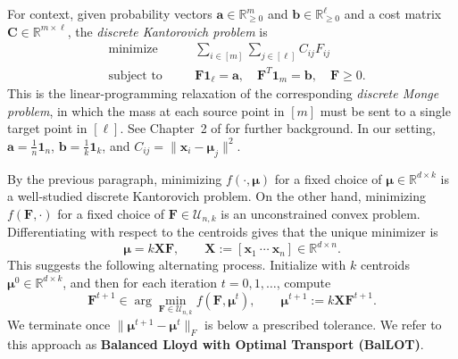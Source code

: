 \documentclass{article}
\theoremstyle{plain}
\theoremstyle{definition}
\newcommand{\1}{\mathbf{1}}
\newcommand{\Rdk}{\mathbb{R}^{d\times k}}
\newcommand{\bUnk}{\mathcal{U}_{n,k}}
\newcommand{\bmF}{\bm{F}}
\newcommand{\bmu}{\bm{\mu}}
\begin{document}
For context, given probability vectors $\bm{a}\in\mathbb{R}^m_{\geq0}$ and $\bm{b}\in\mathbb{R}^{\ell}_{\geq0}$ and a cost matrix $\bm{C}\in\mathbb{R}^{m\times\ell}$, the \textit{discrete Kantorovich problem} is
\[
\begin{aligned}
&\text{minimize} && \quad \sum_{i\in[m]}\sum_{j\in[\ell]}C_{ij}F_{ij}\\
&\text{subject to} && \quad \bmF\bm{1}_{\ell}=\bm{a},\quad \bmF^T\bm{1}_m=\bm{b},\quad \bmF\geq0.
\end{aligned}
\]
This is the linear-programming relaxation of the corresponding \textit{discrete Monge problem}, in which the mass at each source point in $[m]$ must be sent to a single target point in $[\ell]$.
See Chapter~2 of \cite{Peyr2018ComputationalOT} for further background.
In our setting, $\bm{a}=\frac{1}{n}\bm{1}_n$, $\bm{b}=\frac{1}{k}\bm{1}_k$, and $C_{ij}=\|\bm{x}_i-\bmu_j\|^2$.

By the previous paragraph, minimizing $f(\cdot,\bmu)$ for a fixed choice of $\bmu\in\Rdk$ is a well-studied discrete Kantorovich problem.
On the other hand, minimizing $f(\bmF,\cdot)$ for a fixed choice of $\bmF\in\bUnk$ is an unconstrained convex problem.
Differentiating with respect to the centroids gives that the unique minimizer is
\[
\bmu=k\bm{X}\bmF,
\qquad
\bm{X}:=[\bm{x}_1\ \cdots\ \bm{x}_n]\in\mathbb{R}^{d\times n}.
\]
This suggests the following alternating process.
Initialize with $k$ centroids $\bmu^0\in\Rdk$, and then for each iteration $t=0,1,\ldots$, compute
\begin{equation}
\label{eq: BalLOT iterations}
\bmF^{t+1}\in\arg\min_{\bmF\in\bUnk}f(\bmF,\bmu^t),
\qquad
\bmu^{t+1}:=k\bm{X}\bmF^{t+1}.
\end{equation}
We terminate once $\|\bmu^{t+1}-\bmu^t\|_F$ is below a prescribed tolerance.
We refer to this approach as \textbf{Balanced Lloyd with Optimal Transport (BalLOT)}.




\end{document}
